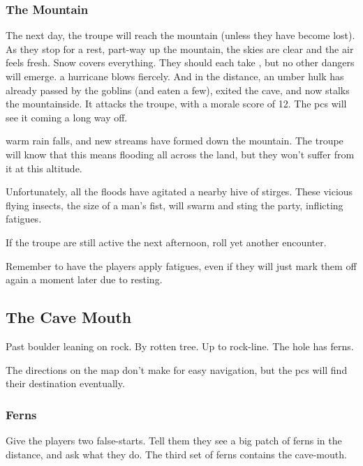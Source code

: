 \begin{multicols}{2}
\subsubsection{The Mountain}
The next day, the troupe will reach the mountain (unless they have become lost).
As they stop for a rest, part-way up the mountain,
\ifcase\value{temperature}
  the skies are clear and the air feels fresh.
  Snow covers everything.
  They should each take , but no other dangers will emerge.
  \or
  a hurricane blows fiercely.
  And in the distance, an umber hulk%
  has already passed by the goblins (and eaten a few), exited the cave, and now stalks the mountainside.
  It attacks the troupe, with a morale score of 12.
  The \glspl{pc} will see it coming a long way off.

  \umberhulk
  \else
  warm rain falls, and new streams have formed down the mountain.
  The troupe will know that this means flooding all across the land, but they won't suffer from it at this altitude.

  Unfortunately, all the floods have agitated a nearby hive of stirges.
  These vicious flying insects, the size of a man's fist, will swarm%
  and sting the party, inflicting \glspl{fatigue}.%

  \stirgeSwarm
\fi

If the troupe are still active the next afternoon, roll yet another encounter.%

Remember to have the players apply \glspl{fatigue}, even if they will just mark them off again a moment later due to resting.

\subsection{The Cave Mouth}

\begin{exampletext}
  Past boulder leaning on rock.
  By rotten tree.
  Up to rock-line.
  The hole has ferns.
\end{exampletext}

The directions on the map don't make for easy navigation, but the \glspl{pc} will find their destination eventually.

\subsubsection{Ferns}
Give the players two false-starts.
Tell them they see a big patch of ferns in the distance, and ask what they do.
The third set of ferns contains the cave-mouth.


\end{multicols}
